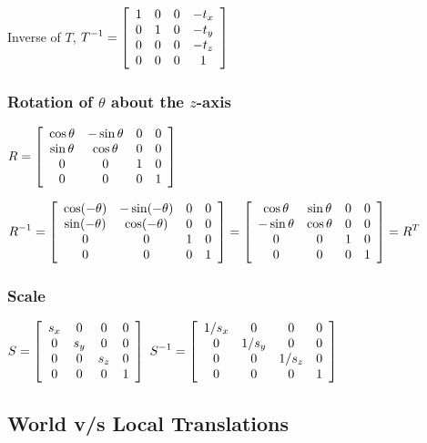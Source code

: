 \vskip 24pt

Inverse of $T$, 
$\displaystyle
T^{-1} = 
\left[
\begin{array}{cccc}
	1 & 0 & 0 & -t_x \cr
	0 & 1 & 0 & -t_y \cr
	0 & 0 & 0 & -t_z \cr
	0 & 0 & 0 & 1 \cr
\end{array}
\right] 
$

\subsubsection{Rotation of $\theta$ about the $z$-axis}

$\displaystyle
R = \left[
\begin{array}{cccc}
	\cos \theta & -\sin \theta & 0 & 0 \cr
	\sin \theta & \cos \theta & 0 & 0 \cr
	0 & 0 & 1 & 0 \cr
	0 & 0 & 0 & 1 \cr
\end{array}
\right] 
$

\vskip 24pt


$\displaystyle
R^{-1} = \left[
\begin{array}{cccc}
	\cos (-\theta) & -\sin (-\theta) & 0 & 0 \cr
	\sin (-\theta) & \cos (-\theta) & 0 & 0 \cr
	0 & 0 & 1 & 0 \cr
	0 & 0 & 0 & 1 \cr
\end{array}
\right] 
= 
\left[
\begin{array}{cccc}
	\cos \theta & \sin \theta & 0 & 0 \cr
	-\sin \theta & \cos \theta & 0 & 0 \cr
	0 & 0 & 1 & 0 \cr
	0 & 0 & 0 & 1 \cr
\end{array}
\right] 
= R^T
$

\subsubsection{Scale}

$\displaystyle
S = 
\left[
\begin{array}{cccc}
	s_x & 0 & 0 & 0 \cr
	0 & s_y & 0 & 0 \cr
	0 & 0 &  s_z &	0 \cr
	0 & 0 & 0 & 1 \cr
\end{array}
\right] 
$
\qquad
$\displaystyle
S^{-1} = 
\left[
\begin{array}{cccc}
	1/s_x & 0 & 0 & 0 \cr
	0 & 1/s_y & 0 & 0 \cr
	0 & 0 &  1/s_z &	0 \cr
	0 & 0 & 0 & 1 \cr	
\end{array}
\right] 
$

\subsection{World v/s Local Translations}

